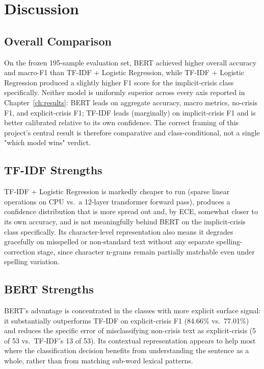 \chapter{Discussion}

\section{Overall Comparison}

On the frozen 195-sample evaluation set, BERT achieved higher overall accuracy and macro-F1 than TF-IDF + Logistic Regression, while TF-IDF + Logistic Regression produced a slightly higher F1 score for the implicit-crisis class specifically. Neither model is uniformly superior across every axis reported in Chapter~\ref{ch:results}: BERT leads on aggregate accuracy, macro metrics, no-crisis F1, and explicit-crisis F1; TF-IDF leads (marginally) on implicit-crisis F1 and is better calibrated relative to its own confidence. The correct framing of this project's central result is therefore comparative and class-conditional, not a single "which model wins" verdict.

\section{TF-IDF Strengths}

TF-IDF + Logistic Regression is markedly cheaper to run (sparse linear operations on CPU vs.\ a 12-layer transformer forward pass), produces a confidence distribution that is more spread out and, by ECE, somewhat closer to its own accuracy, and is not meaningfully behind BERT on the implicit-crisis class specifically. Its character-level representation also means it degrades gracefully on misspelled or non-standard text without any separate spelling-correction stage, since character n-grams remain partially matchable even under spelling variation.

\section{BERT Strengths}

BERT's advantage is concentrated in the classes with more explicit surface signal: it substantially outperforms TF-IDF on explicit-crisis F1 (84.66\% vs.\ 77.01\%) and reduces the specific error of misclassifying non-crisis text as explicit-crisis (5 of 53 vs.\ TF-IDF's 13 of 53). Its contextual representation appears to help most where the classification decision benefits from understanding the sentence as a whole, rather than from matching sub-word lexical patterns.

